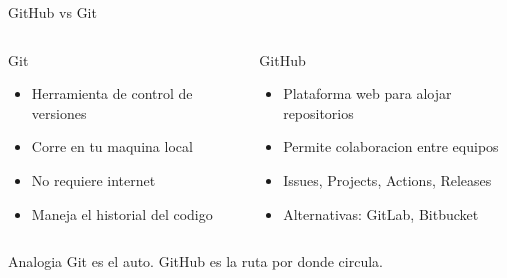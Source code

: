\documentclass[aspectratio=169]{beamer}
\begin{document}
\begin{frame}{GitHub vs Git}
  \begin{columns}
    \begin{block}{Git}
      \begin{itemize}
        \item Herramienta de control de versiones
        \item Corre en tu maquina local
        \item No requiere internet
        \item Maneja el historial del codigo
      \end{itemize}
    \end{block}

    \begin{block}{GitHub}
      \begin{itemize}
        \item Plataforma web para alojar repositorios
        \item Permite colaboracion entre equipos
        \item Issues, Projects, Actions, Releases
        \item Alternativas: GitLab, Bitbucket
      \end{itemize}
    \end{block}
  \end{columns}

  \vspace{0.5cm}

  \begin{alertblock}{Analogia}
    Git es el auto. GitHub es la ruta por donde circula.
  \end{alertblock}
\end{frame}
\end{document}
